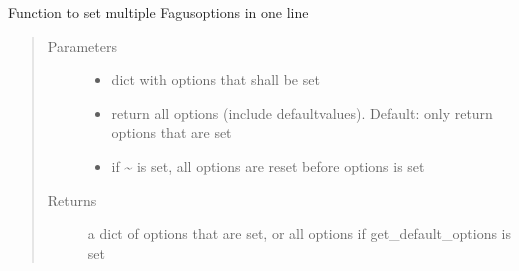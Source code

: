 \documentclass[a4paper,10pt,english]{sphinxmanual}
\begin{document}
\begin{fulllineitems}
\begin{fulllineitems}
\label{\detokenize{fagus.fagus:fagus.fagus.Fagus.options}}
\pysigstartsignatures
{}
\pysigstopsignatures
\sphinxAtStartPar
Function to set multiple Fagus\sphinxhyphen{}options in one line
\begin{quote}\begin{description}
\item[{Parameters}] \leavevmode\begin{itemize}
\item {}
\sphinxAtStartPar
{} \textendash{} dict with options that shall be set

\item {}
\sphinxAtStartPar
{} \textendash{} return all options (include default\sphinxhyphen{}values). Default: only return options that are set

\item {}
\sphinxAtStartPar
{} \textendash{} if \textasciitilde{} is set, all options are reset before options is set

\end{itemize}

\item[{Returns}] \leavevmode
\sphinxAtStartPar
a dict of options that are set, or all options if get\_default\_options is set

\end{description}\end{quote}

\end{fulllineitems}



\end{fulllineitems}
\end{document}
